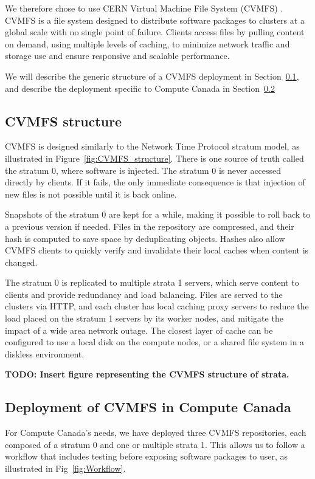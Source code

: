 \documentclass[sigconf]{acmart}
\begin{document}
We therefore chose to use CERN Virtual Machine File System (CVMFS) \cite{CVMFS}. CVMFS is a file system designed to distribute software packages to clusters at a global scale with no single point of failure. Clients access files by pulling content on demand, using multiple levels of caching, to minimize network traffic and storage use and ensure responsive and scalable performance.

We will describe the generic structure of a CVMFS deployment in Section~\ref{sub:CVMFS_structure}, and describe the deployment specific to Compute Canada in Section~\ref{sub:CVMFS_in_CC}

\subsection{CVMFS structure}
\label{sub:CVMFS_structure}
CVMFS is designed similarly to the Network Time Protocol stratum model, as illustrated in Figure~\ref{fig:CVMFS_structure}. There is one source of truth called the stratum 0, where software is injected.  The stratum 0 is never accessed directly by clients. If it fails, the only immediate consequence is that injection of new files is not possible until it is back online. 

Snapshots of the stratum 0 are kept for a while, making it possible to roll back to a previous version if needed. Files in the repository are compressed, and their hash is computed to save space by deduplicating objects. Hashes also allow CVMFS clients to quickly verify and invalidate their local caches when content is changed.

The stratum 0 is replicated to multiple strata 1 servers, which serve content to clients and provide redundancy and load balancing. Files are served to the clusters via HTTP, and each cluster has local caching proxy servers to reduce the load placed on the stratum 1 servers by its worker nodes, and mitigate the impact of a wide area network outage. The closest layer of cache can be configured to use a local disk on the compute nodes, or a shared file system in a diskless environment.

\textbf{TODO: Insert figure representing the CVMFS structure of strata. }
\label{fig:CVMFS_structure}

\subsection{Deployment of CVMFS in Compute Canada}
\label{sub:CVMFS_in_CC}
For Compute Canada's needs, we have deployed three CVMFS repositories, each composed of a stratum 0 and one or multiple strata 1. This allows us to follow a workflow that includes testing before exposing software packages to user, as illustrated in Fig~\ref{fig:Workflow}.
\end{document}
